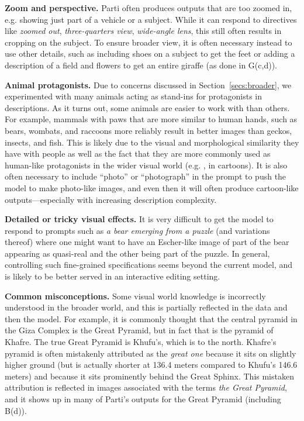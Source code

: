 \textbf{Zoom and perspective.} Parti often produces outputs that are too zoomed in, e.g. showing just part of a vehicle or a subject. While it can respond to directives like \textit{zoomed out}, \textit{three-quarters view}, \textit{wide-angle lens}, this still often results in cropping on the subject. To ensure broader view, it is often necessary instead to use other details, such as including shoes on a subject to get the feet or adding a description of a field and flowers to get an entire giraffe (as done in G(c,d)).

\textbf{Animal protagonists.} Due to concerns discussed in Section~\ref{secs:broader}, we experimented with many animals acting as stand-ins for protagonists in descriptions. As it turns out, some animals are easier to work with than others. For example, mammals with paws that are more similar to human hands, such as bears, wombats, and raccoons more reliably result in better images than geckos, insects, and fish. This is likely due to the visual and morphological similarity they have with people as well as the fact that they are more commonly used as human-like protagonists in the wider visual world (e.g. , in cartoons). It is also often necessary to include ``photo'' or ``photograph'' in the prompt to push the model to make photo-like images, and even then it will often produce cartoon-like outputs---especially with increasing description complexity.

\textbf{Detailed or tricky visual effects.} It is very difficult to get the model to respond to prompts such as \textit{a bear emerging from a puzzle} (and variations thereof) where one might want to have an Escher-like image of part of the bear appearing as quasi-real and the other being part of the puzzle. In general, controlling such fine-grained specifications seems beyond the current model, and is likely to be better served in an interactive editing setting.

\textbf{Common misconceptions.} Some visual world knowledge is incorrectly understood in the broader world, and this is partially reflected in the data and then the model. For example, it is commonly thought that the central pyramid in the Giza Complex is the Great Pyramid, but in fact that is the pyramid of Khafre. The true Great Pyramid is Khufu's, which is to the north. Khafre's pyramid is often mistakenly attributed as the \textit{great one} because it sits on slightly higher ground (but is actually shorter at 136.4 meters compared to Khufu's 146.6 meters) and because it sits prominently behind the Great Sphinx. This mistaken attribution is reflected in images associated with the terms \textit{the Great Pyramid}, and it shows up in many of Parti's outputs for the Great Pyramid (including B(d)).

